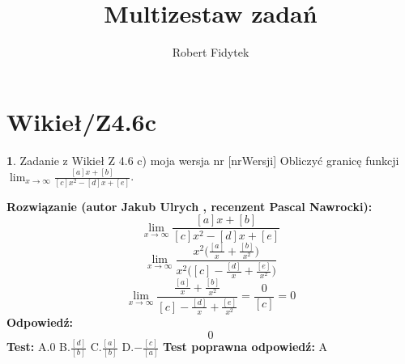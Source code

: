 \documentclass[12pt, a4paper]{article}
\title{Multizestaw zadań}
\author{Robert Fidytek}
\date{}
\theoremstyle{definition} %
\newtheorem{zad}{}
\newcommand{\kategoria}[1]{\section{#1}} %
\newcommand{\zadStart}[1]{\begin{zad}#1\newline} %
\newcommand{\zadStop}{\end{zad}}   %
\newcommand{\rozwStart}[2]{\noindent \textbf{Rozwiązanie (autor #1 , recenzent #2): }\newline} %
\newcommand{\rozwStop}{\newline}                                            %
\newcommand{\odpStart}{\noindent \textbf{Odpowiedź:}\newline}    %
\newcommand{\odpStop}{\newline}                                             %
\newcommand{\testStart}{\noindent \textbf{Test:}\newline} %
\newcommand{\testStop}{\newline} %
\newcommand{\kluczStart}{\noindent \textbf{Test poprawna odpowiedź:}\newline} %
\newcommand{\kluczStop}{\newline} %
\begin{document}
\maketitle


\kategoria{Wikieł/Z4.6c}
\zadStart{Zadanie z Wikieł Z 4.6 c) moja wersja nr [nrWersji]}
Obliczyć granicę funkcji $\lim_{x \to \infty}\frac{[a]x+[b]}{[c]x^{2}-[d]x+[e]}$.
\zadStop
\rozwStart{Jakub Ulrych}{Pascal Nawrocki}
$$\lim_{x \to \infty}\frac{[a]x+[b]}{[c]x^{2}-[d]x+[e]}$$
$$\lim_{x \to \infty}\frac{x^{2}\big(\frac{[a]}{x}+\frac{[b]}{x^{2}}\big)}{x^{2}\big([c]-\frac{[d]}{x}+\frac{[e]}{x^{2}}\big)}$$
$$\lim_{x \to \infty}\frac{\frac{[a]}{x}+\frac{[b]}{x^{2}}}{[c]-\frac{[d]}{x}+\frac{[e]}{x^{2}}}=\frac{0}{[c]}=0$$
\rozwStop
\odpStart
$$0$$
\odpStop
\testStart
A.$0$
B.$\frac{[d]}{[b]}$
C.$\frac{[a]}{[b]}$
D.$-\frac{[c]}{[a]}$
\testStop
\kluczStart
A
\kluczStop
\end{document}
